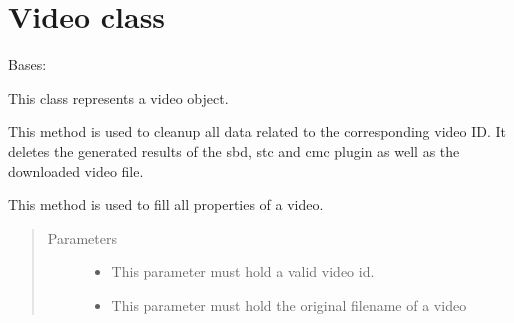 \documentclass[letterpaper,10pt,english,openany,oneside]{sphinxmanual}
\begin{document}
\section{Video class}
\label{\detokenize{Video:video-class}}\label{\detokenize{Video::doc}}

\begin{fulllineitems}
\label{\detokenize{Video:Video.Video}}
Bases: 

This class represents a video object.

\begin{fulllineitems}
\label{\detokenize{Video:Video.Video.cleanup}}
This method is used to cleanup all data related to the corresponding video ID. It deletes the generated results
of the sbd, stc and cmc plugin as well as the downloaded video file.

\end{fulllineitems}


\begin{fulllineitems}
\label{\detokenize{Video:Video.Video.create_video}}
This method is used to fill all properties of a video.
\begin{quote}\begin{description}
\item[{Parameters}] \leavevmode\begin{itemize}
\item {} 
 \textendash{} This parameter must hold a valid video id.

\item {} 
 \textendash{} This parameter must hold the original filename of a video


\end{itemize}
\end{description}
\end{quote}
\end{fulllineitems}
\end{fulllineitems}
\end{document}
